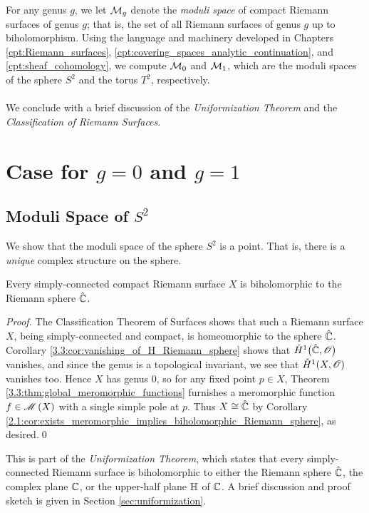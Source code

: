 \documentclass[../Moduli_Spaces_of_Riemann_Surfaces.tex]{subfiles}
\begin{document}
    For any genus $g$, we let $\mathcal{M}_g$ denote the \textit{moduli space} of compact Riemann surfaces of genus $g$; that is, the set of all Riemann surfaces of genus $g$ up to biholomorphism. Using the language and machinery developed in Chapters \ref{cpt:Riemann_surfaces}, \ref{cpt:covering_spaces_analytic_continuation}, and \ref{cpt:sheaf_cohomology}, we compute $\mathcal{M}_0$ and $\mathcal{M}_1$, which are the moduli spaces of the sphere $S^2$ and the torus $T^2$, respectively.\\\ \\
    We conclude with a brief discussion of the \textit{Uniformization Theorem} and the \textit{Classification of Riemann Surfaces}.
    \section{Case for $g=0$ and $g=1$}
    \subsection{Moduli Space of $S^2$}\label{sec:moduli_space_of_sphere}
    We show that the moduli space of the sphere $S^2$ is a point. That is, there is a \textit{unique} complex structure on the sphere.
    \begin{theorem}\label{4.1:thm:simply-connect_compact_biholomorphic_Riemann_sphere}
        Every simply-connected compact Riemann surface $X$ is biholomorphic to the Riemann sphere $\hat{\mathbb{C}}$.
    \end{theorem}
    \begin{proof}
        The Classification Theorem of Surfaces shows that such a Riemann surface $X$, being simply-connected and compact, is homeomorphic to the sphere $\hat{\mathbb{C}}$. Corollary \ref{3.3:cor:vanishing_of_H_Riemann_sphere} shows that $\check{H}^1\big(\hat{\mathbb{C}},\mathscr{O}\big)$ vanishes, and since the genus is a topological invariant, we see that $\check{H}^1\!\left(X,\mathscr{O}\right)$ vanishes too. Hence $X$ has genus $0$, so for any fixed point $p\in X$, Theorem \ref{3.3:thm:global_meromorphic_functions} furnishes a meromorphic function $f\in\mathscr{M}\left(X\right)$ with a single simple pole at $p$. Thus $X\cong\hat{\mathbb{C}}$ by Corollary \ref{2.1:cor:exists_meromorphic_implies_biholomorphic_Riemann_sphere}, as desired.\qed
    \end{proof}
    \begin{remark}
        This is part of the \textit{Uniformization Theorem}, which states that every simply-connected Riemann surface is biholomorphic to either the Riemann sphere $\hat{\mathbb{C}}$, the complex plane $\mathbb{C}$, or the upper-half plane $\mathbb{H}$ of $\mathbb{C}$. A brief discussion and proof sketch is given in Section \ref{sec:uniformization}.\exqed
    \end{remark}
\end{document}
